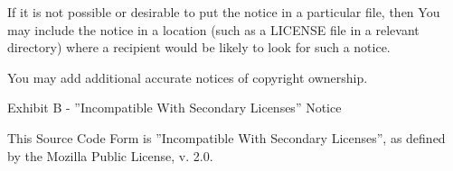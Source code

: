 If it is not possible or desirable to put the notice in a particular file, then You may include the notice in a location (such as a LICENSE file in a relevant directory) where a recipient would be likely to look for such a notice.

You may add additional accurate notices of copyright ownership.

\vparasmall
Exhibit B - ''Incompatible With Secondary Licenses'' Notice

This Source Code Form is ''Incompatible With Secondary Licenses'', as defined by the Mozilla Public License, v. 2.0.







%
%
%
%
%
%
%
%
%
%
%
%
%
%
%
%

